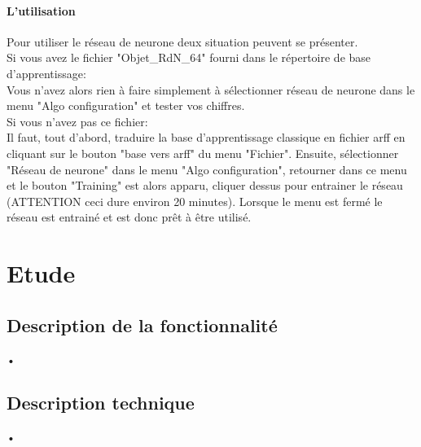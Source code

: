 \documentclass[10pt,a4paper]{report}
\begin{document}
\paragraph{L'utilisation}
\begin{flushleft}
Pour utiliser le réseau de neurone deux situation peuvent se présenter.\\
\vspace*{0.1cm}
Si vous avez le fichier "Objet\_RdN\_64" fourni dans le répertoire de base d'apprentissage:\\
Vous n'avez alors rien à faire simplement à sélectionner réseau de neurone dans le menu "Algo configuration" et tester vos chiffres.\\
\vspace*{0.1cm}
Si vous n'avez pas ce fichier:\\
Il faut, tout d'abord, traduire la base d'apprentissage classique en fichier arff en cliquant sur le bouton "base vers arff" du menu "Fichier". Ensuite, sélectionner "Réseau de neurone" dans le menu "Algo configuration", retourner dans ce menu et le bouton "Training" est alors apparu, cliquer dessus pour entrainer le réseau (ATTENTION ceci dure environ 20 minutes). Lorsque le menu est fermé le réseau est entrainé et est donc prêt à être utilisé.

\end{flushleft}



\section{Etude}

\subsection{Description de la fonctionnalité}
\begin{flushleft}
•
\end{flushleft}

\subsection{Description technique}
\begin{flushleft}
•
\end{flushleft}


\end{document}
